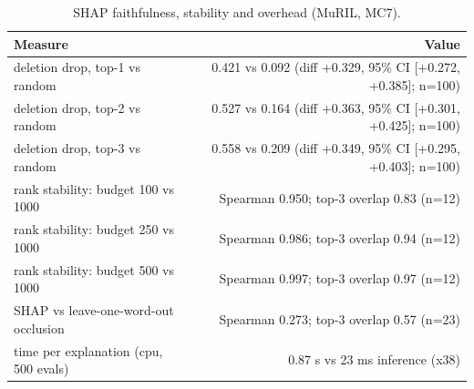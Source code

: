 \begin{table}[t]
\centering
\small
\caption{SHAP faithfulness, stability and overhead (MuRIL, MC7).}
\label{tab:tab15_explainability}
\begin{tabular}{lr}
\toprule
Measure & Value \\
\midrule
deletion drop, top-1 vs random & 0.421 vs 0.092 (diff +0.329, 95\% CI [+0.272, +0.385]; n=100) \\
deletion drop, top-2 vs random & 0.527 vs 0.164 (diff +0.363, 95\% CI [+0.301, +0.425]; n=100) \\
deletion drop, top-3 vs random & 0.558 vs 0.209 (diff +0.349, 95\% CI [+0.295, +0.403]; n=100) \\
rank stability: budget 100 vs 1000 & Spearman 0.950; top-3 overlap 0.83 (n=12) \\
rank stability: budget 250 vs 1000 & Spearman 0.986; top-3 overlap 0.94 (n=12) \\
rank stability: budget 500 vs 1000 & Spearman 0.997; top-3 overlap 0.97 (n=12) \\
SHAP vs leave-one-word-out occlusion & Spearman 0.273; top-3 overlap 0.57 (n=23) \\
time per explanation (cpu, 500 evals) & 0.87 s vs 23 ms inference (x38) \\
\bottomrule
\end{tabular}
\end{table}
